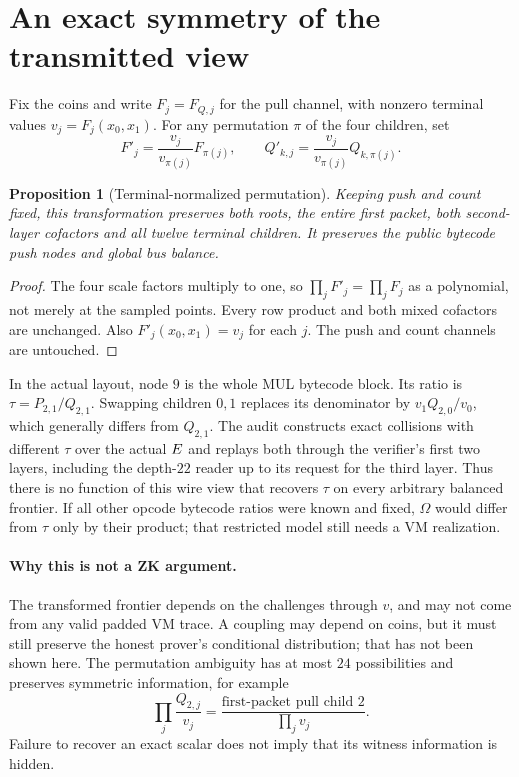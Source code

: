 \documentclass[11pt]{article}
\newtheorem{proposition}{Proposition}
\begin{document}
\section{An exact symmetry of the transmitted view}

Fix the coins and write $F_j=F_{Q,j}$ for the pull channel, with nonzero terminal values $v_j=F_j(x_0,x_1)$. For any permutation $\pi$ of the four children, set
\[
 F'_j=\frac{v_j}{v_{\pi(j)}}F_{\pi(j)},\qquad
 Q'_{k,j}=\frac{v_j}{v_{\pi(j)}}Q_{k,\pi(j)}.
\]

\begin{proposition}[Terminal-normalized permutation]
Keeping push and count fixed, this transformation preserves both roots, the entire first packet, both second-layer cofactors and all twelve terminal children. It preserves the public bytecode push nodes and global bus balance.
\end{proposition}
\begin{proof}
The four scale factors multiply to one, so $\prod_jF'_j=\prod_jF_j$ as a polynomial, not merely at the sampled points. Every row product and both mixed cofactors are unchanged. Also $F'_j(x_0,x_1)=v_j$ for each $j$. The push and count channels are untouched.
\end{proof}

In the actual layout, node $9$ is the whole MUL bytecode block. Its ratio is $\tau=P_{2,1}/Q_{2,1}$. Swapping children $0,1$ replaces its denominator by $v_1Q_{2,0}/v_0$, which generally differs from $Q_{2,1}$. The audit constructs exact collisions with different $\tau$ over the actual $E$ and replays both through the verifier's first two layers, including the depth-$22$ reader up to its request for the third layer. Thus there is no function of this wire view that recovers $\tau$ on every arbitrary balanced frontier. If all other opcode bytecode ratios were known and fixed, $\Omega$ would differ from $\tau$ only by their product; that restricted model still needs a VM realization.

\paragraph{Why this is not a ZK argument.} The transformed frontier depends on the challenges through $v$, and may not come from any valid padded VM trace. A coupling may depend on coins, but it must still preserve the honest prover's conditional distribution; that has not been shown here. The permutation ambiguity has at most $24$ possibilities and preserves symmetric information, for example
\[
 \prod_j\frac{Q_{2,j}}{v_j}
   =\frac{\text{first-packet pull child }2}{\prod_jv_j}.
\]
Failure to recover an exact scalar does not imply that its witness information is hidden.
\end{document}
